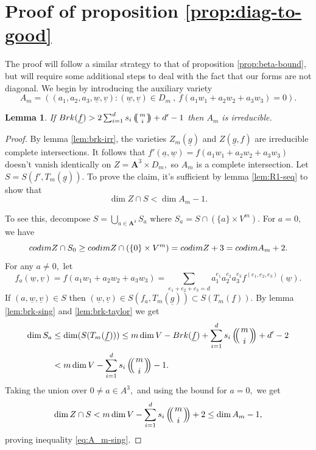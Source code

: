 \documentclass[10pt,a4paper]{amsart}
\let\ul\underline
\newtheorem{lemma}[theorem]{Lemma}
\theoremstyle{definition}
\def\multiset#1#2{\ensuremath{\left(\kern-.3em\left(\genfrac{}{}{0pt}{}{#1}{#2}\right)\kern-.3em\right)}}
\newcommand{\A}{\mathbf{A}}
\newcommand{\codim}{\textnormal{codim}}
\newcommand{\brk}{\textnormal{Brk}}
\begin{document}
\section{Proof of proposition \ref{prop:diag-to-good}}

    The proof will follow a similar strategy to that of proposition \ref{prop:beta-bound}, but will require some additional steps to deal with the fact that our forms are not diagonal. We begin by introducing the auxiliary variety
    \[
    A_m = ((a_1,a_2,a_3,\ul{w},\ul{v}):(\ul{w},\ul{v}) \in D_m\ ,\ f(a_1w_1+a_2w_2+a_3w_3) = 0).
    \]
    
    \begin{lemma}\label{lem:A_m-irr}
        If $ \brk(\ul{f}) >  2\sum_{i=1}^d s_i \multiset{m}{i}+d'-1 $ then $A_m$ is irreducible.
    \end{lemma}

    \begin{proof}
         By lemma \ref{lem:brk-irr}, the varieties $Z_m(\ul{g})$ and $Z(\ul{g},f)$ are irreducible complete intersections. It follows that $f'(\ul{a},\ul{w}) = f(a_1w_1+a_2w_2+a_3w_3)$ doesn't vanish identically on $Z = \A^3\times D_m,$ so $A_m$ is a complete intersection. Let $S = S(f',T_m(\ul{g})).$ To prove the claim, it's sufficient  by lemma \ref{lem:R1-seq} to show that
         \begin{equation}\label{eq:A_m-sing}
             \dim Z\cap  S  < \dim A_m-1.
         \end{equation}
    
    To see this, decompose $ S = \bigcup_{a\in \A^3} S_a$ where $S_a = S\cap (\{a\}\times V^m).$  For $a = 0,$ we have
    \[
    \codim Z\cap  S_0 \ge \codim Z\cap (\{0\}\times V^m) = \codim Z+3   = \codim A_m+2.
    \]
    For any $a\neq 0,$ let  
    \[
    f_a(\ul{w},\ul{v}) = f(a_1w_1+a_2w_2+a_3w_3) = \sum_{e_1+e_2+e_3 = d} a_1^{e_1} a_2^{e_2} a_3^{e_3} f^{(e_1,e_2,e_3)}(\ul{w}).
    \]
    If $(a,\ul{w},\ul{v})\in S$ then $(\ul{w},\ul{v})\in S(f_a, T_m(\ul{g}))\subset S(T_m(\ul{f})).$ By lemma \ref{lem:brk-sing} and \ref{lem:brk-taylor} we get
    \begin{align*}
         \dim S_a &\le \dim(S(T_m(\ul{f}))) \le  m\dim V - \brk(\ul{f}) + \sum_{i=1}^d s_i\multiset{m}{i} + d' -2  \\
         &< m\dim V -  \sum_{i=1}^d s_i \multiset{m}{i} -1.
    \end{align*}
    Taking the union over $0\neq a\in A^3,$ and using the bound for $a=0,$ we get
    \[
    \dim Z\cap S <  m\dim V -  \sum_{i=1}^d s_i \multiset{m}{i} +2 \le \dim A_m-1,
    \]
    proving inequality \eqref{eq:A_m-sing}.
    \end{proof}
\end{document}
